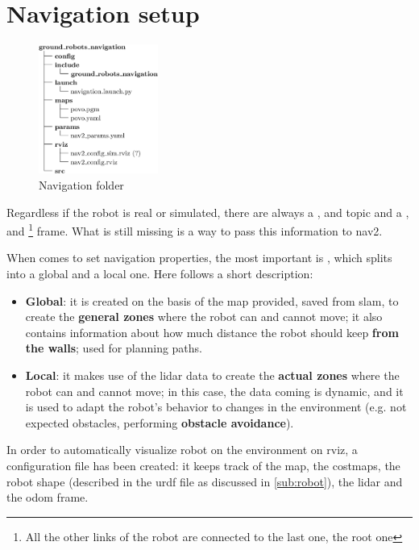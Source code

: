 \section{Navigation setup}

\begin{figure}
    \includegraphics[width=0.35\textwidth]{images/nav_folder}
    \caption{Navigation folder}
\end{figure}


Regardless if the robot is real or simulated, there are always a ,  and  topic and a ,  and \footnote{All the other links of the robot are connected to the last one, the root one} frame. What is still missing is a way to pass this information to \acrshort{nav2}.

When comes to set navigation properties, the most important is , which splits into a global and a local one. Here follows a short description:
\begin{itemize}
    \item \textbf{Global}: it is created on the basis of the map provided, saved from \acrshort{slam}, to create the \textbf{general zones} where the robot can and cannot move; it also contains information about how much distance the robot should keep \textbf{from the walls}; used for planning paths.
    \item \textbf{Local}: it makes use of the lidar data to create the \textbf{actual zones} where the robot can and cannot move; in this case, the data coming is dynamic, and it is used to adapt the robot's behavior to changes in the environment (e.g. not expected obstacles, performing \textbf{obstacle avoidance}).
\end{itemize}

In order to automatically visualize robot on the environment on \acrshort{rviz}, a configuration file has been created: it keeps track of the map, the costmaps, the robot shape (described in the \acrshort{urdf} file as discussed in \autoref{sub:robot}), the lidar and the odom frame. 

